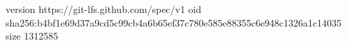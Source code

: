 version https://git-lfs.github.com/spec/v1
oid sha256:b4bf1e69d37a9cd5c99cb4a6b65ef37c780e585e88355c6e948c1326a1c14035
size 1312585
